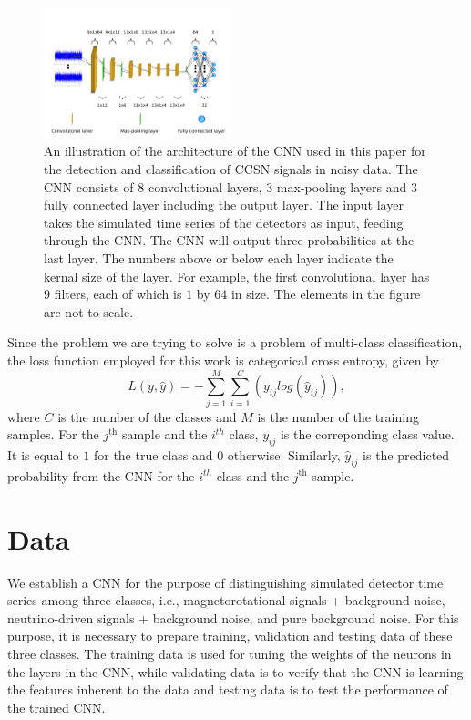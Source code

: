 \documentclass[aps,twocolumn,showpacs,groupedaddress, nofootinbib]{revtex4}  %
\begin{document}
\begin{figure}
\includegraphics[width=0.48\textwidth]{CNN.png}
\caption{An illustration of the architecture of the \ac{CNN} used in this paper for the detection and classification of \ac{CCSN} signals in noisy data.
The \ac{CNN} consists of $8$ convolutional layers, $3$ max-pooling layers and $3$ fully connected layer including the output layer.
The input layer takes the simulated time series of the detectors as input, feeding through the \ac{CNN}. The \ac{CNN} will output three probabilities at the last layer.
The numbers above or below each layer indicate the kernal size of the layer. For example, the first convolutional layer has $9$ filters, 
each of which is $1$ by $64$ in size. 
The elements in the figure are not to scale.
\label{fig:CNN}}
\end{figure}
Since the problem we are trying to solve is a problem of multi-class classification, 
the loss function employed for this work is categorical cross entropy\cite{abadi2016tensorflow}, given by
\begin{equation}\label{eq:cce}
 L(y,\hat{y}) = -\sum^M_{j=1}\sum^C_{i=1}(y_{ij}log(\hat{y}_{ij})),
\end{equation}
where $C$ is the number of the classes and $M$ is the number of the training samples.
For the $j^{\text{th}}$ sample and the $i^{th}$ class, $y_{ij}$ is the correponding class value. It is equal to $1$ for the true class and $0$ otherwise.
Similarly, $\hat{y}_{ij}$ is the predicted probability from the \ac{CNN} for the $i^{th}$ class and the $j^{\text{th}}$ sample.


\section{Data}\label{sec:spwf}
We establish a \ac{CNN} for the purpose of distinguishing simulated detector time series among three classes, 
i.e., magnetorotational signals + background noise, neutrino-driven signals + background noise, and pure background noise. 
For this purpose, it is necessary to prepare training, validation and testing data of these three classes.
The training data is used for tuning the weights of the neurons in the layers in the \ac{CNN}, 
while validating data is to verify that the \ac{CNN} is learning the features inherent to the data and testing data is to test the performance of the trained \ac{CNN}. 
\end{document}
